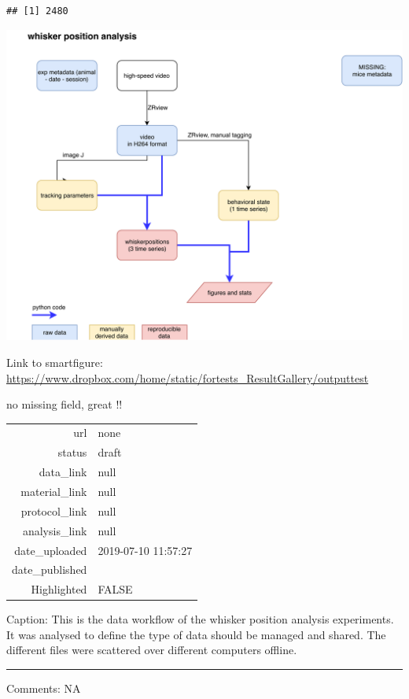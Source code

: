 \documentclass[]{article}
\begin{document}
\begin{vwcol}[widths={0.6,0.4}]

\begin{verbatim}
## [1] 2480
\end{verbatim}

\includegraphics{static/fortests_ResultGallery/figures/Data_workflow_before_DM_wh/Data_workflow_before_DM_wh.png}

Link to smartfigure:
\url{https://www.dropbox.com/home/static/fortests_ResultGallery/outputtest}

no missing field, great !!

\begin{tabular}{rl}
  \hline
  \hline
url & none \\ 
  status & draft \\ 
  data\_link & null \\ 
  material\_link & null \\ 
  protocol\_link & null \\ 
  analysis\_link & null \\ 
  date\_uploaded & 2019-07-10 11:57:27 \\ 
  date\_published &  \\ 
  Highlighted & FALSE \\ 
   \hline
\end{tabular}

\end{vwcol}

Caption: This is the data workflow of the whisker position analysis
experiments. It was analysed to define the type of data should be
managed and shared. The different files were scattered over different
computers offline.

\begin{center}\rule{0.5\linewidth}{\linethickness}\end{center}

Comments: NA
\end{document}
